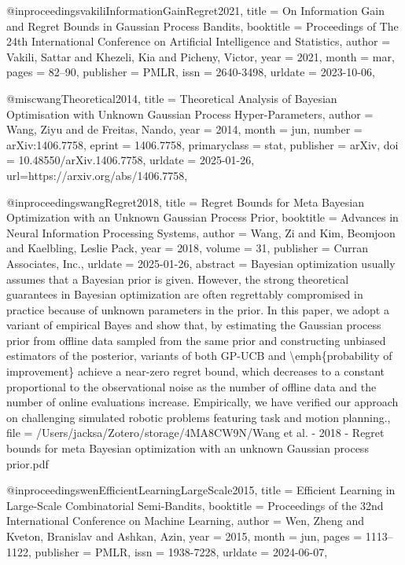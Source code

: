 @inproceedings{vakiliInformationGainRegret2021,
  title = {On {{Information Gain}} and {{Regret Bounds}} in {{Gaussian Process Bandits}}},
  booktitle = {Proceedings of {{The}} 24th {{International Conference}} on {{Artificial Intelligence}} and {{Statistics}}},
  author = {Vakili, Sattar and Khezeli, Kia and Picheny, Victor},
  year = {2021},
  month = mar,
  pages = {82--90},
  publisher = {PMLR},
  issn = {2640-3498},
  urldate = {2023-10-06},
}

@misc{wangTheoretical2014,
  title = {Theoretical {{Analysis}} of {{Bayesian Optimisation}} with {{Unknown Gaussian Process Hyper-Parameters}}},
  author = {Wang, Ziyu and de Freitas, Nando},
  year = {2014},
  month = jun,
  number = {arXiv:1406.7758},
  eprint = {1406.7758},
  primaryclass = {stat},
  publisher = {arXiv},
  doi = {10.48550/arXiv.1406.7758},
  urldate = {2025-01-26},
  url={https://arxiv.org/abs/1406.7758}, 
}

@inproceedings{wangRegret2018,
  title = {Regret Bounds for Meta {{Bayesian}} Optimization with an Unknown {{Gaussian}} Process Prior},
  booktitle = {Advances in {{Neural Information Processing Systems}}},
  author = {Wang, Zi and Kim, Beomjoon and Kaelbling, Leslie Pack},
  year = {2018},
  volume = {31},
  publisher = {Curran Associates, Inc.},
  urldate = {2025-01-26},
  abstract = {Bayesian optimization usually assumes that a Bayesian prior is given. However, the strong theoretical guarantees in Bayesian optimization are often regrettably compromised in practice because of unknown parameters in the prior. In this paper, we adopt a variant of empirical Bayes and show that,  by estimating the Gaussian process prior from offline data sampled from the same prior and constructing unbiased estimators of the posterior, variants of both GP-UCB and {\textbackslash}emph\{probability of improvement\} achieve a near-zero regret bound, which decreases to a constant proportional to the observational noise as the number of offline data and the number of online evaluations increase. Empirically, we have verified our approach on challenging simulated robotic problems featuring task and motion planning.},
  file = {/Users/jacksa/Zotero/storage/4MA8CW9N/Wang et al. - 2018 - Regret bounds for meta Bayesian optimization with an unknown Gaussian process prior.pdf}
}

@inproceedings{wenEfficientLearningLargeScale2015,
  title = {Efficient {{Learning}} in {{Large-Scale Combinatorial Semi-Bandits}}},
  booktitle = {Proceedings of the 32nd {{International Conference}} on {{Machine Learning}}},
  author = {Wen, Zheng and Kveton, Branislav and Ashkan, Azin},
  year = {2015},
  month = jun,
  pages = {1113--1122},
  publisher = {PMLR},
  issn = {1938-7228},
  urldate = {2024-06-07},
}


